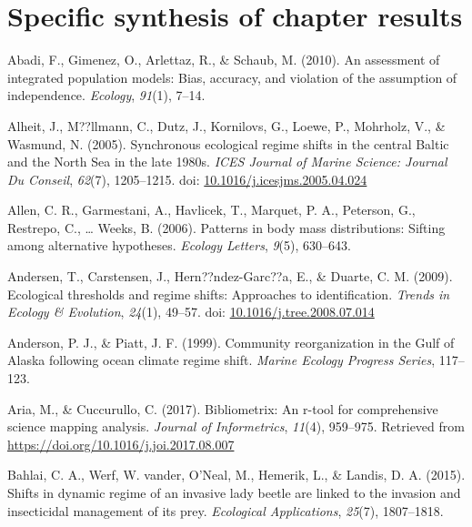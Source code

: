 \documentclass[12pt,twoside,openany]{reedthesis}
\begin{document}
\hypertarget{specific-synthesis-of-chapter-results}{%
\section{Specific synthesis of chapter results}\label{specific-synthesis-of-chapter-results}}

\hypertarget{refs}{}
\leavevmode\hypertarget{ref-abadi2010assessment}{}%
Abadi, F., Gimenez, O., Arlettaz, R., \& Schaub, M. (2010). An assessment of integrated population models: Bias, accuracy, and violation of the assumption of independence. \emph{Ecology}, \emph{91}(1), 7--14.

\leavevmode\hypertarget{ref-alheit_synchronous_2005}{}%
Alheit, J., M??llmann, C., Dutz, J., Kornilovs, G., Loewe, P., Mohrholz, V., \& Wasmund, N. (2005). Synchronous ecological regime shifts in the central Baltic and the North Sea in the late 1980s. \emph{ICES Journal of Marine Science: Journal Du Conseil}, \emph{62}(7), 1205--1215. doi: \href{https://doi.org/10.1016/j.icesjms.2005.04.024}{10.1016/j.icesjms.2005.04.024}

\leavevmode\hypertarget{ref-allen2006patterns}{}%
Allen, C. R., Garmestani, A., Havlicek, T., Marquet, P. A., Peterson, G., Restrepo, C., \ldots{} Weeks, B. (2006). Patterns in body mass distributions: Sifting among alternative hypotheses. \emph{Ecology Letters}, \emph{9}(5), 630--643.

\leavevmode\hypertarget{ref-andersen_ecological_2009}{}%
Andersen, T., Carstensen, J., Hern??ndez-Garc??a, E., \& Duarte, C. M. (2009). Ecological thresholds and regime shifts: Approaches to identification. \emph{Trends in Ecology \& Evolution}, \emph{24}(1), 49--57. doi: \href{https://doi.org/10.1016/j.tree.2008.07.014}{10.1016/j.tree.2008.07.014}

\leavevmode\hypertarget{ref-anderson_community_1999}{}%
Anderson, P. J., \& Piatt, J. F. (1999). Community reorganization in the Gulf of Alaska following ocean climate regime shift. \emph{Marine Ecology Progress Series}, 117--123.

\leavevmode\hypertarget{ref-bibliometrix}{}%
Aria, M., \& Cuccurullo, C. (2017). Bibliometrix: An r-tool for comprehensive science mapping analysis. \emph{Journal of Informetrics}, \emph{11}(4), 959--975. Retrieved from \url{https://doi.org/10.1016/j.joi.2017.08.007}

\leavevmode\hypertarget{ref-bahlai2015shifts}{}%
Bahlai, C. A., Werf, W. vander, O'Neal, M., Hemerik, L., \& Landis, D. A. (2015). Shifts in dynamic regime of an invasive lady beetle are linked to the invasion and insecticidal management of its prey. \emph{Ecological Applications}, \emph{25}(7), 1807--1818.
\end{document}
